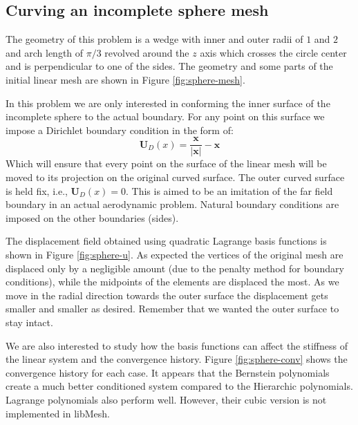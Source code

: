\documentclass[letter,12pt]{article}
\newcommand*{\hvec}[1]{\mathbf{#1}}
\begin{document}
\subsection*{Curving an incomplete sphere mesh}

The geometry of this problem is a wedge with inner and outer radii of
$1$ and $2$ and arch length of $\pi/3$ revolved around the $z$ axis which
crosses the circle center and is perpendicular to one of the sides.
The geometry and some parts of the initial linear mesh are shown in
Figure \ref{fig:sphere-mesh}.

In this problem we are only interested in conforming the inner surface
of the incomplete sphere to the actual boundary. For any point on this
surface we impose a Dirichlet boundary condition in the form of:
\[
\hvec{U}_D(x) = \frac{\hvec{x}}{|\hvec{x}|} - \hvec{x}
\]
Which will ensure that every point on the surface of the linear mesh
will be moved to its projection on the original curved surface.  The
outer curved surface is held fix, i.e., $\hvec{U}_D(x)=0$. This is
aimed to be an imitation of the far field boundary in an actual
aerodynamic problem. Natural boundary conditions are imposed on the
other boundaries (sides).

The displacement field obtained using quadratic Lagrange basis
functions is shown in Figure \ref{fig:sphere-u}. As expected the
vertices of the original mesh are displaced only by a negligible
amount (due to the penalty method for boundary conditions), while the
midpoints of the elements are displaced the most. As we move in the
radial direction towards the outer surface the displacement gets
smaller and smaller as desired. Remember that we wanted the outer
surface to stay intact.

We are also interested to study how the basis functions can affect the
stiffness of the linear system and the convergence history. Figure
\ref{fig:sphere-conv} shows the convergence history for each case. It
appears that the Bernstein polynomials create a much better
conditioned system compared to the Hierarchic polynomials. Lagrange
polynomials also perform well. However, their cubic version is not
implemented in libMesh.
\end{document}
